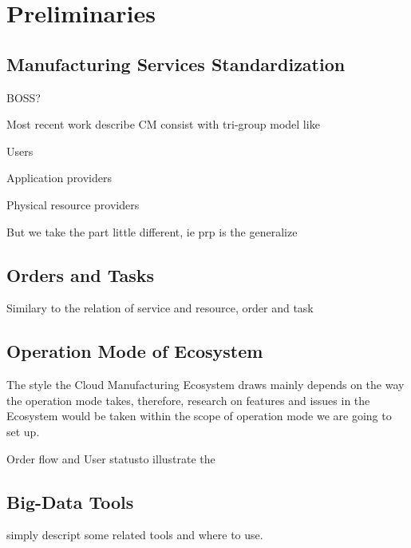 \section{Preliminaries} %
\subsection{Manufacturing Services Standardization}


BOSS?


Most recent work describe CM consist with tri-group model like \begin{inparaenum}[1)]
\item Users
\item Application providers
\item Physical resource providers
\end{inparaenum}

But we take the part little different, ie prp is the generalize

\subsection{Orders and Tasks}
Similary to the relation of service and resource, order and task 

\subsection{Operation Mode of Ecosystem}
The style the Cloud Manufacturing Ecosystem draws mainly depends on the way the operation mode takes, therefore, research on features and issues in the Ecosystem would be taken within the scope of operation mode we are going to set up.  

Order flow and User statusto illustrate the 

\subsection{Big-Data Tools}
simply descript some related tools and where to use.
